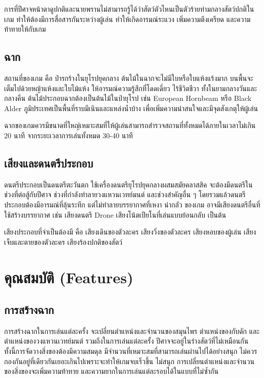การที่ปีศาจหน้าตาดูปกติและนายพรานไม่สามารถรู้ได้ว่าสัตว์ตัวไหนเป็นตัวร้ายท่ามกลางสัตว์ปกติในเกม ทำให้ต้องมีการสื่อสารกันระหว่างผู้เล่น ทำให้เกิดอารมณ์ระแวง เพิ่มความตึงเครียด และความท้าทายให้กับเกม

\subsection{ฉาก}

สถานที่ของเกม คือ ป่ารกร้างในยุโรปยุคกลาง ต้นไม้ในฉากจะไม่มีใบหรือใบแห้งแร้งมาก บนพื้นจะเต็มไปด้วยหญ้าแห้งและใบไม้แห้ง ให้อารมณ์ความรู้สึกที่โดดเดี่ยว ไร้ชีวิตชีวา ทั้งในยามกลางวันและกลางคืน ต้นไม้ประกอบฉากต้องเป็นต้นไม้ในป่ายุโรป เช่น European Hornbeam หรือ Black Alder ภูมิประเทศเป็นพื้นที่ราบมีเนินและแหล่งน้ำบ้าง เพื่อเพิ่มความน่าสนใจและมีจุดสังเกตุให้ผู้เล่น

ฉากของเกมควรมีขนาดที่ใหญ่เหมาะสมที่ให้ผู้เล่นสามารถสำรวจสถานที่ทั้งหมดได้ภายในเวลาไม่เกิน 20 นาที จากระยะเวลาการเล่นทั้งหมด 30-40 นาที

\subsection{เสียงและดนตรีประกอบ}

ดนตรีประกอบเป็นดนตรีตะวันตก ใช้เครื่องดนตรียุโรปยุคกลางผสมสมัยคลาสสิค จะต้องมีดนตรีในช่วงที่ต่อสู้กับปีศาจ ช่วงที่กำลังทำลายวงแหวนเวทย์มนต์ และช่วงสำคัญอื่น ๆ โดยรวมแล้วดนตรีประกอบต้องมีอารมณ์ที่ลุ้นระทึก แต่ไม่ทำลายบรรยากาศที่เหงา น่ากลัว ของเกม อาจมีเสียงดนตรีอื่นที่ใช้สร้างบรรยากาศ เช่น เสียงดนตรี Drone เสียงโน้ตเปียโนที่เล่นแบบย้อนกลับ เป็นต้น

เสียงประกอบที่จำเป็นต้องมี คือ เสียงเดินของตัวละคร เสียงวิ่งของตัวละคร เสียงหอบของผู้เล่น
เสียงเจ็บและตายของตัวละคร เสียงร้องปกติของสัตว์

\section{คุณสมบัติ (Features)}

\subsection{การสร้างฉาก}

การสร้างฉากในการเล่นแต่ละครั้ง จะเปลี่ยนตำแหน่งและจำนวนของสมุนไพร ตำแหน่งของกับดัก และตำแหน่งของวงแหวนเวทย์มนต์ รวมถึงในการเล่นแต่ละครั้ง ปีศาจจะอยู่ในร่างสัตว์ที่ไม่เหมือนกัน ทั้งนี้การจัดวางสิ่งของต้องมีความสมดุล มีจำนวนที่เหมาะสมที่สามารถเล่นผ่านไปได้อย่างสนุก ไม่ควรกองกันอยู่ที่เดียวกันเยอะเกินไปเพราะจะทำให้เกมจบเร็วขึ้น ไม่สนุก การเปลี่ยนตำแหน่งและจำนวนของสิ่งของจะเพิ่มความท้าทาย และความยากในการเล่นแต่ละรอบได้ในแบบที่ไม่ซ้ำกัน  

